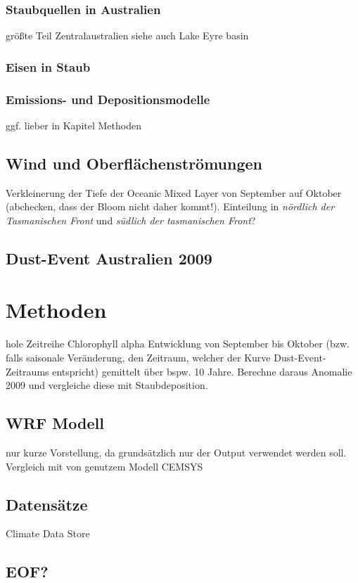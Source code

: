 \documentclass[12pt,a4paper,onecolumn]{scrartcl}
\begin{document}
\subsubsection{Staubquellen in Australien}
größte Teil Zentralaustralien \citep{Shao.2011} siehe auch Lake Eyre basin
\subsubsection{Eisen in Staub}
\subsubsection{Emissions- und Depositionsmodelle}
ggf. lieber in Kapitel Methoden
\subsection{Wind und Oberflächenströmungen}
Verkleinerung der Tiefe der Oceanic Mixed Layer von September auf Oktober \citep{Tilburg.2002} (abchecken, dass der Bloom nicht daher kommt!). Einteilung in \textit{nördlich der Tasmanischen Front} und \textit{südlich der tasmanischen Front}?
\subsection{Dust-Event Australien 2009}




\section{Methoden}
hole Zeitreihe Chlorophyll alpha Entwicklung von September bis Oktober (bzw. falls saisonale Veränderung, den Zeitraum, welcher der Kurve Dust-Event-Zeitraums entspricht) gemittelt über bspw. 10 Jahre. Berechne daraus Anomalie 2009 und vergleiche diese mit Staubdeposition.
\subsection{WRF Modell}
nur kurze Vorstellung, da grundsätzlich nur der Output verwendet werden soll. Vergleich mit von \cite{Gabric.2016} genutzem Modell CEMSYS
\subsection{Datensätze}
Climate Data Store \nocite{*}
\subsection{EOF?}
\end{document}
